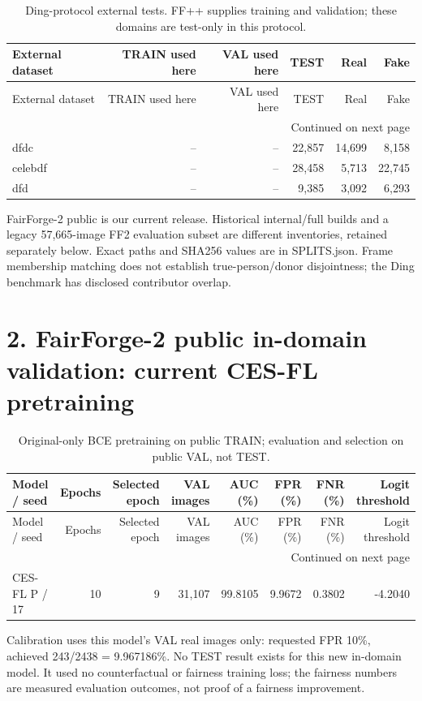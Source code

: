 \documentclass[10pt]{article}
\begin{document}
\begin{longtable}{@{}lrrrrr@{}}
\caption{Ding-protocol external tests. FF++ supplies training and validation; these domains are test-only in this protocol.}\\
\toprule
External dataset & TRAIN used here & VAL used here & TEST & Real & Fake \\
\midrule
\endfirsthead
\toprule
External dataset & TRAIN used here & VAL used here & TEST & Real & Fake \\
\midrule
\endhead
\midrule
\multicolumn{6}{r}{Continued on next page}\\
\endfoot
\bottomrule
\endlastfoot
dfdc & -- & -- & 22,857 & 14,699 & 8,158 \\
celebdf & -- & -- & 28,458 & 5,713 & 22,745 \\
dfd & -- & -- & 9,385 & 3,092 & 6,293 \\
\end{longtable}

FairForge-2 public is our current release. Historical internal/full builds and a legacy 57,665-image FF2 evaluation subset are different inventories, retained separately below. Exact paths and SHA256 values are in SPLITS.json. Frame membership matching does not establish true-person/donor disjointness; the Ding benchmark has disclosed contributor overlap.

\section*{2. FairForge-2 public in-domain validation: current CES-FL pretraining}
\begin{longtable}{@{}lrrrrrrr@{}}
\caption{Original-only BCE pretraining on public TRAIN; evaluation and selection on public VAL, not TEST.}\\
\toprule
Model / seed & Epochs & Selected epoch & VAL images & AUC (\%) & FPR (\%) & FNR (\%) & Logit threshold \\
\midrule
\endfirsthead
\toprule
Model / seed & Epochs & Selected epoch & VAL images & AUC (\%) & FPR (\%) & FNR (\%) & Logit threshold \\
\midrule
\endhead
\midrule
\multicolumn{8}{r}{Continued on next page}\\
\endfoot
\bottomrule
\endlastfoot
CES-FL P / 17 & 10 & 9 & 31,107 & 99.8105 & 9.9672 & 0.3802 & -4.2040 \\
\end{longtable}

Calibration uses this model's VAL real images only: requested FPR 10\%, achieved 243/2438 = 9.967186\%. No TEST result exists for this new in-domain model. It used no counterfactual or fairness training loss; the fairness numbers are measured evaluation outcomes, not proof of a fairness improvement.
\end{document}
